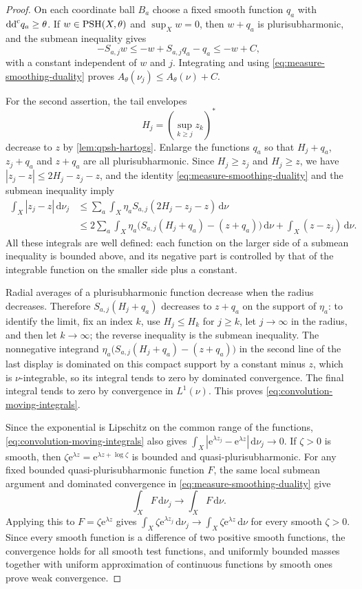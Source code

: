 \begin{proof}
On each coordinate ball $B_a$ choose a fixed smooth function $q_a$ with $\mathrm{dd}^{\mathrm{c}} q_a\geq\theta$. If $w\in\mathrm{PSH}(X,\theta)$ and $\sup_Xw=0$, then $w+q_a$ is plurisubharmonic, and the submean inequality gives
\[
 -S_{a,j}w\leq-w+S_{a,j}q_a-q_a\leq-w+C,
\]
with a constant independent of $w$ and $j$. Integrating and using \eqref{eq:measure-smoothing-duality} proves $A_\theta(\nu_j)\leq A_\theta(\nu)+C$.

For the second assertion, the tail envelopes
\[
 H_j=\left(\sup_{k\geq j}z_k\right)^*
\]
decrease to $z$ by \cref{lem:qpsh-hartogs}. Enlarge the functions $q_a$ so that $H_j+q_a$, $z_j+q_a$ and $z+q_a$ are all plurisubharmonic. Since $H_j\geq z_j$ and $H_j\geq z$, we have $|z_j-z|\leq2H_j-z_j-z$, and the identity \eqref{eq:measure-smoothing-duality} and the submean inequality imply
\[
 \begin{split}
 \int_X|z_j-z|\,\mathrm{d}\nu_j
 &\leq\sum_a\int_X\eta_a S_{a,j}(2H_j-z_j-z)\,\mathrm{d}\nu\\
 &\leq2\sum_a\int_X\eta_a
       \bigl(S_{a,j}(H_j+q_a)-(z+q_a)\bigr)\,\mathrm{d}\nu
       +\int_X(z-z_j)\,\mathrm{d}\nu.
 \end{split}
\]
All these integrals are well defined: each function on the larger side of a submean inequality is bounded above, and its negative part is controlled by that of the integrable function on the smaller side plus a constant.

Radial averages of a plurisubharmonic function decrease when the radius decreases. Therefore $S_{a,j}(H_j+q_a)$ decreases to $z+q_a$ on the support of $\eta_a$: to identify the limit, fix an index $k$, use $H_j\leq H_k$ for $j\geq k$, let $j\to\infty$ in the radius, and then let $k\to\infty$; the reverse inequality is the submean inequality. The nonnegative integrand $\eta_a\bigl(S_{a,j}(H_j+q_a)-(z+q_a)\bigr)$ in the second line of the last display is dominated on this compact support by a constant minus $z$, which is $\nu$-integrable, so its integral tends to zero by dominated convergence. The final integral tends to zero by convergence in $L^1(\nu)$. This proves \eqref{eq:convolution-moving-integrals}.

Since the exponential is Lipschitz on the common range of the functions, \eqref{eq:convolution-moving-integrals} also gives $\int_X|\mathrm{e}^{\lambda z_j}-\mathrm{e}^{\lambda z}|\,\mathrm{d}\nu_j\to0$. If $\zeta>0$ is smooth, then $\zeta \mathrm{e}^{\lambda z}=\mathrm{e}^{\lambda z+\log\zeta}$ is bounded and quasi-plurisubharmonic. For any fixed bounded quasi-plurisubharmonic function $F$, the same local submean argument and dominated convergence in \eqref{eq:measure-smoothing-duality} give
\[
 \int_XF\,\mathrm{d}\nu_j\longrightarrow\int_XF\,\mathrm{d}\nu.
\]
Applying this to $F=\zeta \mathrm{e}^{\lambda z}$ gives $\int_X\zeta\mathrm{e}^{\lambda z_j}\,\mathrm{d}\nu_j\to\int_X\zeta\mathrm{e}^{\lambda z}\,\mathrm{d}\nu$ for every smooth $\zeta>0$. Since every smooth function is a difference of two positive smooth functions, the convergence holds for all smooth test functions, and uniformly bounded masses together with uniform approximation of continuous functions by smooth ones prove weak convergence.
\end{proof}

